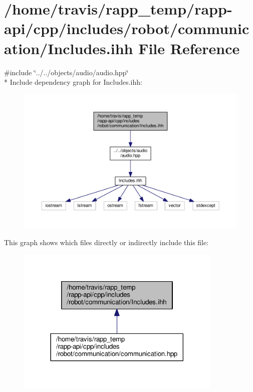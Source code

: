 \hypertarget{robot_2communication_2Includes_8ihh}{\section{/home/travis/rapp\-\_\-temp/rapp-\/api/cpp/includes/robot/communication/\-Includes.ihh File Reference}
\label{robot_2communication_2Includes_8ihh}
}
{\ttfamily \#include \char`\"{}../../objects/audio/audio.\-hpp\char`\"{}}\\*
Include dependency graph for Includes.\-ihh\-:
\nopagebreak
\begin{figure}[H]
\begin{center}
\leavevmode
\includegraphics[width=350pt]{robot_2communication_2Includes_8ihh__incl}
\end{center}
\end{figure}
This graph shows which files directly or indirectly include this file\-:
\nopagebreak
\begin{figure}[H]
\begin{center}
\leavevmode
\includegraphics[width=278pt]{robot_2communication_2Includes_8ihh__dep__incl}
\end{center}
\end{figure}
